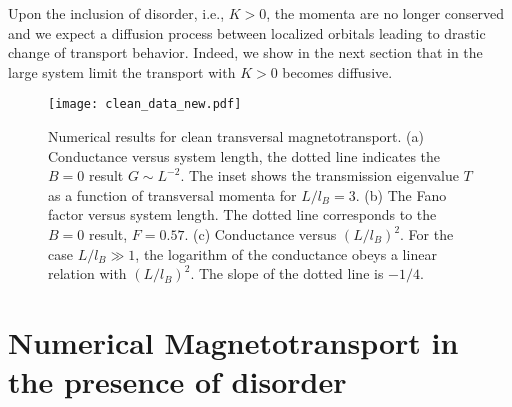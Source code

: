 \documentclass[aps,prb,10pt,amsmath,amssymb,twocolumn,floatfix,superscriptaddress,showpacs,numerical,footinbib]{revtex4-1}
\begin{document}
Upon the inclusion of disorder, i.e., $K>0$, the momenta are no longer conserved and we expect a diffusion process between localized orbitals leading to drastic change of transport behavior.
%
Indeed, we show in the next section that in the large system limit the transport with $K>0$ becomes diffusive.

\begin{figure}
\texttt{[image: clean\_data\_new.pdf]}
\caption{\label{fig:clean_transport} Numerical results for clean transversal
magnetotransport.
%
(a) Conductance versus system length, the dotted line indicates the $B=0$ result $G\sim L^{-2}$.
%
The inset shows the transmission eigenvalue $T$ as a function of transversal momenta for $L/l_{B}=3$.
%
(b) The Fano factor versus system length. The dotted line corresponds to the $B=0$ result, $F = 0.57$.
%
(c) Conductance  versus $(L/l_{B})^{2}$. For the case $L/l_{B}\gg 1$, the logarithm of the conductance obeys a linear relation with $(L/l_{B})^{2}$.
%
The slope of the dotted line is $-1/4$.}
\end{figure}


\section{Numerical Magnetotransport in the presence of disorder \label{sec:numerical}}
\end{document}

